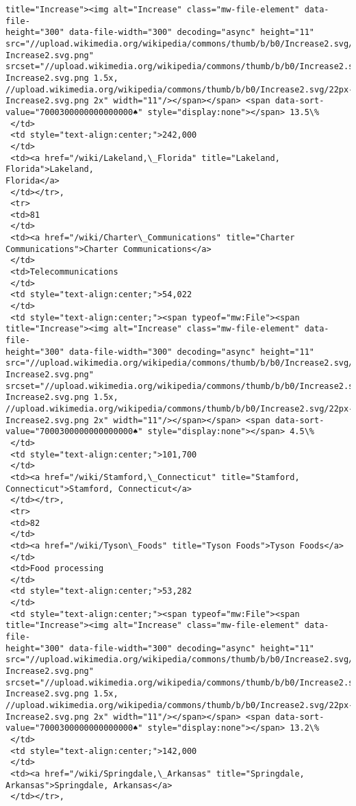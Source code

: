 \documentclass[11pt]{article}
\begin{document}
\begin{tcolorbox}[breakable, size=fbox, boxrule=.5pt, pad at break*=1mm, opacityfill=0]
\begin{Verbatim}[commandchars=\\\{\}]
title="Increase"><img alt="Increase" class="mw-file-element" data-file-
height="300" data-file-width="300" decoding="async" height="11"
src="//upload.wikimedia.org/wikipedia/commons/thumb/b/b0/Increase2.svg/11px-
Increase2.svg.png"
srcset="//upload.wikimedia.org/wikipedia/commons/thumb/b/b0/Increase2.svg/17px-
Increase2.svg.png 1.5x,
//upload.wikimedia.org/wikipedia/commons/thumb/b/b0/Increase2.svg/22px-
Increase2.svg.png 2x" width="11"/></span></span> <span data-sort-
value="7000300000000000000♠" style="display:none"></span> 13.5\%
 </td>
 <td style="text-align:center;">242,000
 </td>
 <td><a href="/wiki/Lakeland,\_Florida" title="Lakeland, Florida">Lakeland,
Florida</a>
 </td></tr>,
 <tr>
 <td>81
 </td>
 <td><a href="/wiki/Charter\_Communications" title="Charter
Communications">Charter Communications</a>
 </td>
 <td>Telecommunications
 </td>
 <td style="text-align:center;">54,022
 </td>
 <td style="text-align:center;"><span typeof="mw:File"><span
title="Increase"><img alt="Increase" class="mw-file-element" data-file-
height="300" data-file-width="300" decoding="async" height="11"
src="//upload.wikimedia.org/wikipedia/commons/thumb/b/b0/Increase2.svg/11px-
Increase2.svg.png"
srcset="//upload.wikimedia.org/wikipedia/commons/thumb/b/b0/Increase2.svg/17px-
Increase2.svg.png 1.5x,
//upload.wikimedia.org/wikipedia/commons/thumb/b/b0/Increase2.svg/22px-
Increase2.svg.png 2x" width="11"/></span></span> <span data-sort-
value="7000300000000000000♠" style="display:none"></span> 4.5\%
 </td>
 <td style="text-align:center;">101,700
 </td>
 <td><a href="/wiki/Stamford,\_Connecticut" title="Stamford,
Connecticut">Stamford, Connecticut</a>
 </td></tr>,
 <tr>
 <td>82
 </td>
 <td><a href="/wiki/Tyson\_Foods" title="Tyson Foods">Tyson Foods</a>
 </td>
 <td>Food processing
 </td>
 <td style="text-align:center;">53,282
 </td>
 <td style="text-align:center;"><span typeof="mw:File"><span
title="Increase"><img alt="Increase" class="mw-file-element" data-file-
height="300" data-file-width="300" decoding="async" height="11"
src="//upload.wikimedia.org/wikipedia/commons/thumb/b/b0/Increase2.svg/11px-
Increase2.svg.png"
srcset="//upload.wikimedia.org/wikipedia/commons/thumb/b/b0/Increase2.svg/17px-
Increase2.svg.png 1.5x,
//upload.wikimedia.org/wikipedia/commons/thumb/b/b0/Increase2.svg/22px-
Increase2.svg.png 2x" width="11"/></span></span> <span data-sort-
value="7000300000000000000♠" style="display:none"></span> 13.2\%
 </td>
 <td style="text-align:center;">142,000
 </td>
 <td><a href="/wiki/Springdale,\_Arkansas" title="Springdale,
Arkansas">Springdale, Arkansas</a>
 </td></tr>,

\end{Verbatim}
\end{tcolorbox}
\end{document}
